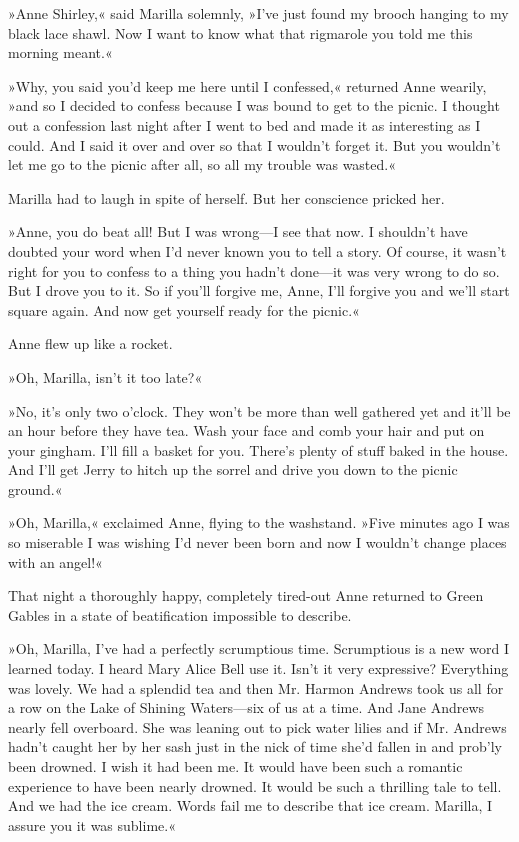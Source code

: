 »Anne Shirley,« said Marilla solemnly, »I've just found my brooch hanging to my black lace shawl. Now I want to know what that rigmarole you told me this morning meant.«

»Why, you said you'd keep me here until I confessed,« returned Anne wearily, »and so I decided to confess because I was bound to get to the picnic. I thought out a confession last night after I went to bed and made it as interesting as I could. And I said it over and over so that I wouldn't forget it. But you wouldn't let me go to the picnic after all, so all my trouble was wasted.«

Marilla had to laugh in spite of herself. But her conscience pricked her.

»Anne, you do beat all! But I was wrong—I see that now. I shouldn't have doubted your word when I'd never known you to tell a story. Of course, it wasn't right for you to confess to a thing you hadn't done—it was very wrong to do so. But I drove you to it. So if you'll forgive me, Anne, I'll forgive you and we'll start square again. And now get yourself ready for the picnic.«

Anne flew up like a rocket.

»Oh, Marilla, isn't it too late?«

»No, it's only two o'clock. They won't be more than well gathered yet and it'll be an hour before they have tea. Wash your face and comb your hair and put on your gingham. I'll fill a basket for you. There's plenty of stuff baked in the house. And I'll get Jerry to hitch up the sorrel and drive you down to the picnic ground.«

»Oh, Marilla,« exclaimed Anne, flying to the washstand. »Five minutes ago I was so miserable I was wishing I'd never been born and now I wouldn't change places with an angel!«

That night a thoroughly happy, completely tired-out Anne returned to Green Gables in a state of beatification impossible to describe.

»Oh, Marilla, I've had a perfectly scrumptious time. Scrumptious is a new word I learned today. I heard Mary Alice Bell use it. Isn't it very expressive? Everything was lovely. We had a splendid tea and then Mr. Harmon Andrews took us all for a row on the Lake of Shining Waters—six of us at a time. And Jane Andrews nearly fell overboard. She was leaning out to pick water lilies and if Mr. Andrews hadn't caught her by her sash just in the nick of time she'd fallen in and prob'ly been drowned. I wish it had been me. It would have been such a romantic experience to have been nearly drowned. It would be such a thrilling tale to tell. And we had the ice cream. Words fail me to describe that ice cream. Marilla, I assure you it was sublime.«

